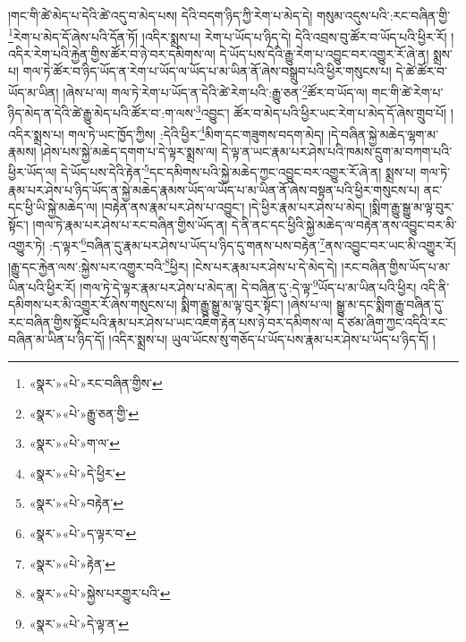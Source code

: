 །གང་གི་ཚེ་མེད་པ་དེའི་ཚེ་འདུ་བ་མེད་པས། དེའི་བདག་ཉིད་ཀྱི་རེག་པ་མེད་དེ། གསུམ་འདུས་པའི་:རང་བཞིན་གྱི་\footnote{«སྣར་»«པེ་»རང་བཞིན་གྱིས་}རེག་པ་མེད་དོ་ཞེས་པའི་དོན་ཏོ། །འདིར་སྨྲས་པ། རེག་པ་ཡོད་པ་ཉིད་དེ། དེའི་འབྲས་བུ་ཚོར་བ་ཡོད་པའི་ཕྱིར་རོ། །འདིར་རེག་པའི་རྐྱེན་གྱིས་ཚོར་བ་ཉེ་བར་དམིགས་ལ། དེ་ཡོད་པས་དེའི་རྒྱུ་རེག་པ་འབྱུང་བར་འགྱུར་རོ་ཞེ་ན། སྨྲས་པ། གལ་ཏེ་ཚོར་བ་ཉིད་ཡོད་ན་རེག་པ་ཡོད་ལ་ཡོད་པ་མ་ཡིན་ནོ་ཞེས་བསྒྲུབ་པའི་ཕྱིར་གསུངས་པ། དེ་ཚེ་ཚོར་བ་ཡོད་མ་ཡིན། །ཞེས་པ་ལ། གལ་ཏེ་རེག་པ་ཡོད་ན་དེའི་ཚེ་རེག་པའི་:རྒྱུ་ཅན་\footnote{«སྣར་»«པེ་»རྒྱུ་ཅན་གྱི་}ཚོར་བ་ཡོད་ལ། གང་གི་ཚེ་རེག་པ་ཉིད་མེད་ན་དེའི་ཚེ་རྒྱུ་མེད་པའི་ཚོར་བ་:ག་ལས་\footnote{«སྣར་»«པེ་»ག་ལ་}འབྱུང་། ཚོར་བ་མེད་པའི་ཕྱིར་ཡང་རེག་པ་མེད་དོ་ཞེས་གྲུབ་པོ། །འདིར་སྨྲས་པ། གལ་ཏེ་ཡང་ཁྱོད་ཀྱིས། :དེའི་ཕྱིར་\footnote{«སྣར་»«པེ་»དེ་ཕྱིར་}མིག་དང་གཟུགས་བདག་མེད། །དེ་བཞིན་སྐྱེ་མཆེད་ལྷག་མ་རྣམས། །ཤེས་པས་སྐྱེ་མཆེད་དགག་པ་དེ་ལྟར་སྨྲས་ལ། དེ་ལྟ་ན་ཡང་རྣམ་པར་ཤེས་པའི་ཁམས་དྲུག་མ་བཀག་པའི་ཕྱིར་ཡོད་ལ། དེ་ཡོད་པས་དེའི་རྟེན་\footnote{«སྣར་»«པེ་»བརྟེན་}དང་དམིགས་པའི་སྐྱེ་མཆེད་ཀྱང་འབྱུང་བར་འགྱུར་རོ་ཞེ་ན། སྨྲས་པ། གལ་ཏེ་རྣམ་པར་ཤེས་པ་ཉིད་ཡོད་ན་སྐྱེ་མཆེད་རྣམས་ཡོད་ལ་ཡོད་པ་མ་ཡིན་ནོ་ཞེས་བསྟན་པའི་ཕྱིར་གསུངས་པ། ནང་དང་ཕྱི་ཡི་སྐྱེ་མཆེད་ལ། །བརྟེན་ནས་རྣམ་པར་ཤེས་པ་འབྱུང་། །དེ་ཕྱིར་རྣམ་པར་ཤེས་པ་མེད། །སྨིག་རྒྱུ་སྒྱུ་མ་ལྟ་བུར་སྟོང་། །གལ་ཏེ་རྣམ་པར་ཤེས་པ་རང་བཞིན་གྱིས་ཡོད་ན། དེ་ནི་ནང་དང་ཕྱིའི་སྐྱེ་མཆེད་ལ་བརྟེན་ནས་འབྱུང་བར་མི་འགྱུར་ཏེ། :ད་ལྟར་\footnote{«སྣར་»«པེ་»ད་ལྟར་བ་}བཞིན་དུ་རྣམ་པར་ཤེས་པ་ཡོད་པ་ཉིད་དུ་གནས་པས་བརྟེན་\footnote{«སྣར་»«པེ་»རྟེན་}ནས་འབྱུང་བར་ཡང་མི་འགྱུར་རོ། །རྒྱུ་དང་རྐྱེན་ལས་:སྐྱེས་པར་འགྱུར་བའི་\footnote{«སྣར་»«པེ་»སྐྱེས་པརགྱུར་པའི་}ཕྱིར། །ངེས་པར་རྣམ་པར་ཤེས་པ་དེ་མེད་དེ། །རང་བཞིན་གྱིས་ཡོད་པ་མ་ཡིན་པའི་ཕྱིར་རོ། །གལ་ཏེ་དེ་ལྟར་རྣམ་པར་ཤེས་པ་མེད་ན། དེ་བཞིན་དུ་:དེ་ལྟ་\footnote{«སྣར་»«པེ་»དེ་ལྟ་ན་}ཡོད་པ་མ་ཡིན་པའི་ཕྱིར། འདི་ནི་དམིགས་པར་མི་འགྱུར་རོ་ཞེས་གསུངས་པ། སྨིག་རྒྱུ་སྒྱུ་མ་ལྟ་བུར་སྟོང་། །ཞེས་པ་ལ། སྒྱུ་མ་དང་སྨིག་རྒྱུ་བཞིན་དུ་རང་བཞིན་གྱིས་སྟོང་པའི་རྣམ་པར་ཤེས་པ་ཡང་འཇིག་རྟེན་པས་ཉེ་བར་དམིགས་ལ། དེ་ཙམ་ཞིག་ཀྱང་འདིའི་རང་བཞིན་མ་ཡིན་པ་ཉིད་དོ། །འདིར་སྨྲས་པ། ཡུལ་ཡོངས་སུ་གཅོད་པ་ཡོད་པས་རྣམ་པར་ཤེས་པ་ཡོད་པ་ཉིད་དོ། །
